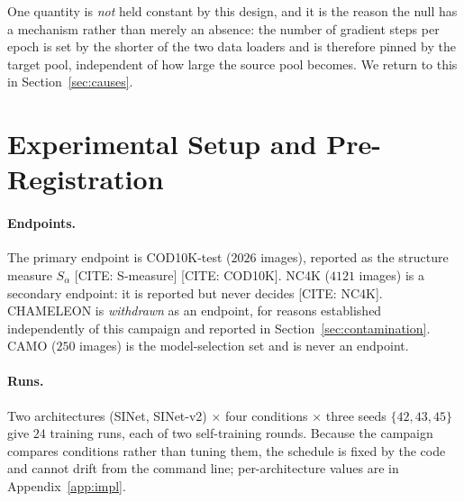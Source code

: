 \documentclass{article}
\begin{document}
One quantity is \emph{not} held constant by this design, and it is the reason the
null has a mechanism rather than merely an absence: the number of gradient steps
per epoch is set by the shorter of the two data loaders and is therefore pinned
by the target pool, independent of how large the source pool becomes. We return
to this in Section~\ref{sec:causes}.

\section{Experimental Setup and Pre-Registration}
\label{sec:setup}

\paragraph{Endpoints.}
The primary endpoint is COD10K-test ($2026$ images), reported as the structure
measure $S_\alpha$ [CITE: S-measure] [CITE: COD10K]. NC4K ($4121$ images) is a
secondary endpoint: it is reported but never decides
[CITE: NC4K]. CHAMELEON is \emph{withdrawn} as an endpoint, for reasons
established independently of this campaign and reported in
Section~\ref{sec:contamination}. CAMO ($250$ images) is the model-selection set
and is never an endpoint.

\paragraph{Runs.}
Two architectures (SINet, SINet-v2) $\times$ four conditions $\times$ three
seeds $\{42,43,45\}$ give $24$ training runs, each of two self-training rounds.
Because the campaign compares conditions rather than tuning them, the schedule
is fixed by the code and cannot drift from the command line; per-architecture
values are in Appendix~\ref{app:impl}.
\end{document}
